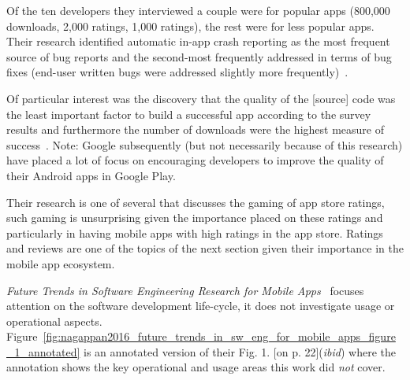 Of the ten developers they interviewed a couple were for popular apps (800,000 downloads, 2,000 ratings, 1,000 ratings), the rest were for less popular apps. %
Their research identified automatic in-app crash reporting as the most frequent source of bug reports and the second-most frequently addressed in terms of bug fixes (end-user written bugs were addressed slightly more frequently)~\citep[p. 10]{alsubaihin2019app_store_effects_on_software_engineering}. 

Of particular interest was the discovery that the quality of the [source] code was the least important factor to build a successful app according to the survey results and furthermore the number of downloads were the highest measure of success~\citep[p. 13]{alsubaihin2019app_store_effects_on_software_engineering}. Note: Google subsequently (but not necessarily because of this research) have placed a lot of focus on encouraging developers to improve the quality of their Android apps in Google Play. 

Their research is one of several that discusses the gaming of app store ratings, such gaming is unsurprising given the importance placed on these ratings and particularly in having mobile apps with high ratings in the app store. Ratings and reviews are one of the topics of the next section  given their importance in the mobile app ecosystem.

\emph{Future Trends in Software Engineering Research for Mobile Apps}~\citep{nagappan2016_future_trends_in_sw_eng_for_mobile_apps} focuses attention on the software development life-cycle, it does not investigate usage or operational aspects. Figure~\ref{fig:nagappan2016_future_trends_in_sw_eng_for_mobile_apps_figure_1_annotated} is an annotated version of their Fig. 1. [on p. 22](\textit{ibid}) where the annotation shows the key operational and usage areas this work did \emph{not} cover. 

